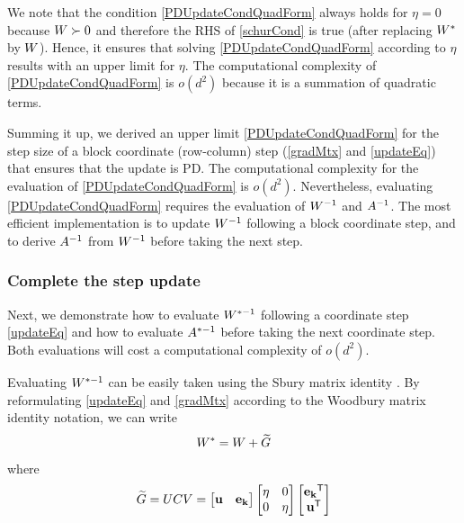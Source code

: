 \documentclass{article}
\begin{document}
We note that the condition \eqref{PDUpdateCondQuadForm} always holds for $\eta = 0$ because ${W}\succ0$ and therefore the RHS of \eqref{schurCond} is true (after replacing ${W}^*$ by ${W}$). Hence, it ensures that solving \eqref{PDUpdateCondQuadForm} according to $\eta$ results with an upper limit for $\eta$.  The computational complexity of \eqref{PDUpdateCondQuadForm} is $o(d^2)$ because it is a summation of quadratic terms. 

Summing it up, we derived an upper limit \eqref{PDUpdateCondQuadForm} for the step size of a block coordinate (row-column) step (\eqref{gradMtx} and \eqref{updateEq}) that ensures that the update is PD. The computational complexity for the evaluation of \eqref{PDUpdateCondQuadForm} is $o(d^2)$. Nevertheless, evaluating \eqref{PDUpdateCondQuadForm} requires the evaluation of ${W}^{-1}$ and ${A}^{-1}$. The most efficient implementation is to update ${W}^{-1}$ following a block coordinate step, and to derive ${A}^{-1}$ from ${W}^{-1}$ before taking the next step. 

\subsubsection{Complete the step update}

Next, we demonstrate how to evaluate ${W}^{*-1}$ following a coordinate step \eqref{updateEq} and how to evaluate ${A}^{*-1}$ before taking the next coordinate step. Both evaluations will cost a computational complexity of $o(d^2)$.

Evaluating ${W}^{*-1}$ can be easily taken using the Sbury matrix identity . By reformulating \eqref{updateEq} and \eqref{gradMtx} according to the Woodbury matrix identity notation, we can write
\begin{equation}
{W^*} = {W}+{\widetilde{G}}
\label{updateEqWDB}
\end{equation}
where
\begin{equation}
{\widetilde{G}} = {U}{C}{V} = \left[ \begin{matrix} \mathbf{u} & \mathbf{e_k} \end{matrix} \right] \left[ \begin{matrix} \eta & 0 \\ 0 & \eta \end{matrix} \right] \left[ \begin{matrix} \mathbf{e_k}{}^\mathsf{T} \\ \mathbf{u}{}^\mathsf{T} \end{matrix} \right]
\label{gradMtxWDB}
\end{equation}
\end{document}
